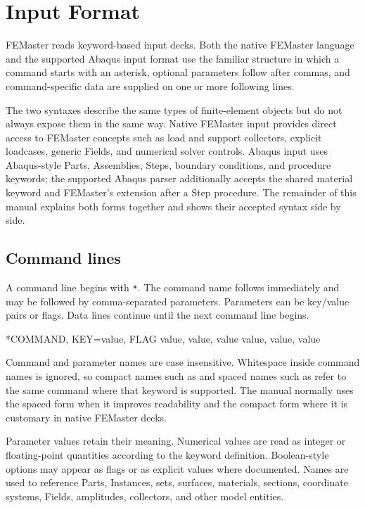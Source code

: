 \chapter{Input Format}
\label{chap:input-format}

FEMaster reads keyword-based input decks. Both the native FEMaster language and the supported Abaqus input format use the familiar structure in which a command starts with an asterisk, optional parameters follow after commas, and command-specific data are supplied on one or more following lines.

The two syntaxes describe the same types of finite-element objects but do not always expose them in the same way. Native FEMaster input provides direct access to FEMaster concepts such as load and support collectors, explicit loadcases, generic Fields, and numerical solver controls. Abaqus input uses Abaqus-style Parts, Assemblies, Steps, boundary conditions, and procedure keywords; the supported Abaqus parser additionally accepts the shared  material keyword and FEMaster's  extension after a Step procedure. The remainder of this manual explains both forms together and shows their accepted syntax side by side.

\section{Command lines}

A command line begins with \texttt{*}. The command name follows immediately and may be followed by comma-separated parameters. Parameters can be key/value pairs or flags. Data lines continue until the next command line begins.

\begin{syntax}
*COMMAND, KEY=value, FLAG
value, value, value
value, value, value
\end{syntax}

Command and parameter names are case insensitive. Whitespace inside command names is ignored, so compact names such as  and spaced names such as  refer to the same command where that keyword is supported. The manual normally uses the spaced form when it improves readability and the compact form where it is customary in native FEMaster decks.

Parameter values retain their meaning. Numerical values are read as integer or floating-point quantities according to the keyword definition. Boolean-style options may appear as flags or as explicit values where documented. Names are used to reference Parts, Instances, sets, surfaces, materials, sections, coordinate systems, Fields, amplitudes, collectors, and other model entities.

